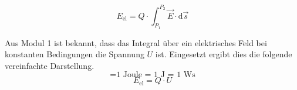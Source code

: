{\begin{equation}
	E_\mathrm{el} = Q \cdot \int_{P_\mathrm{1}}^{P_\mathrm{2}} \vec{E} \cdot \mathrm{d}\vec{s}
\end{equation}

Aus Modul 1 ist bekannt, dass das Integral über ein elektrisches Feld bei konstanten Bedingungen die Spannung $U$ ist. 
Eingesetzt ergibt dies die folgende vereinfachte Darstellung.
\newpage
\begin{equation*}
	[E_\mathrm{el}] = \text{1 Joule = 1 J = 1 Ws} 
\end{equation*}
\vspace{0.1cm}
\begin{equation}
    E_\mathrm{el} = Q \cdot U
\end{equation}

}%
